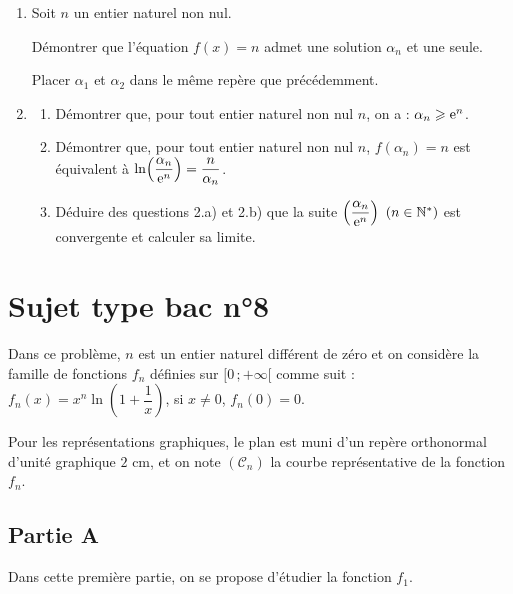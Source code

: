 \begin{enumerate}
	\item Soit $n$ un entier naturel non nul.

	Démontrer que l'équation $f(x)=n$ admet une solution $\alpha_n$ et une seule.

	Placer $\alpha_1$ et $\alpha_2$ dans le même repère que précédemment.
	\item
	\begin{enumerate}
		\item Démontrer que, pour tout entier naturel non nul $n$, on a : $\alpha_n \geqslant \mathrm{e}^n$.
		\item Démontrer que, pour tout entier naturel non nul $n$, $f(\alpha_n)=n$ est équivalent à $\ln\!\left(\dfrac{\alpha_n}{\mathrm{e}^n}\right) = \dfrac{n}{\alpha_n}$.
		\item Déduire des questions 2.a) et 2.b) que la suite $\left(\dfrac{\alpha_n}{\mathrm{e}^n}\right)$ $(n\in\mathbb{N}^*)$ est convergente et calculer sa limite.
	\end{enumerate}
\end{enumerate}


\section*{Sujet type bac n°8}

Dans ce problème, $n$ est un entier naturel différent de zéro et on considère la famille de fonctions $f_n$ définies sur $[0\,;+\infty[$ comme suit : $f_n(x)=x^n\ln\!\left(1+\dfrac1x\right)$, si $x\neq0$, $f_n(0)=0$.

Pour les représentations graphiques, le plan est muni d'un repère orthonormal d'unité graphique $2$ cm, et on note $(\mathscr{C}_n)$ la courbe représentative de la fonction $f_n$.

\subsection*{Partie A}

Dans cette première partie, on se propose d'étudier la fonction $f_1$.

